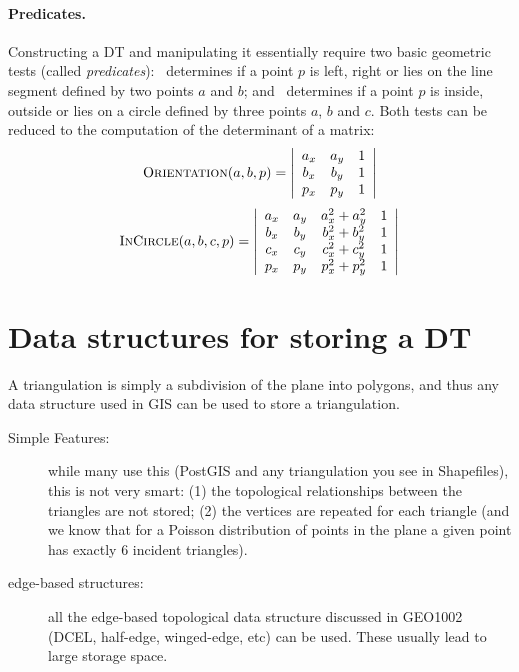 \paragraph{Predicates.}
Constructing a DT and manipulating it essentially require two basic geometric tests (called \emph{predicates}): \Orient\ determines if a point $p$ is left, right or lies on the line segment defined by two points $a$ and $b$; and \Insphere\ determines if a point $p$ is inside, outside or lies on a circle defined by three points $a$, $b$ and $c$. 
Both tests can be reduced to the computation of the determinant of a matrix:
\begin{equation}
  \textrm{O}\textsc{rientation}(a, b, p) = 
  \left| 
  \begin{array}{cccc}
    a_{x} & a_{y} & 1 \\
    b_{x} & b_{y} & 1 \\
    p_{x} & p_{y} & 1 
  \end{array} 
  \right| 
\end{equation}
\begin{equation}
  \textrm{I}\textsc{n}\textrm{C}\textsc{ircle}(a, b, c, p) = 
  \left| 
  \begin{array}{ccccc}
    a_{x} & a_{y} & a^{2}_{x} + a^{2}_{y} & 1 \\
    b_{x} & b_{y} & b^{2}_{x} + b^{2}_{y} & 1 \\
    c_{x} & c_{y} & c^{2}_{x} + c^{2}_{y} & 1 \\
    p_{x} & p_{y} & p^{2}_{x} + p^{2}_{y} & 1 
  \end{array} 
  \right|
\label{eq:insphere}
\end{equation}


\section{Data structures for storing a DT}

A triangulation is simply a subdivision of the plane into polygons, and thus any data structure used in GIS can be used to store a triangulation.

\begin{description}
  \item[Simple Features:] while many use this (PostGIS and any triangulation you see in Shapefiles), this is not very smart: (1) the topological relationships between the triangles are not stored; (2) the vertices are repeated for each triangle (and we know that for a Poisson distribution of points in the plane a given point has exactly 6 incident triangles).
  \item[edge-based structures:] all the edge-based topological data structure discussed in GEO1002 (DCEL, half-edge, winged-edge, etc) can be used. These usually lead to large storage space.
\end{description}

